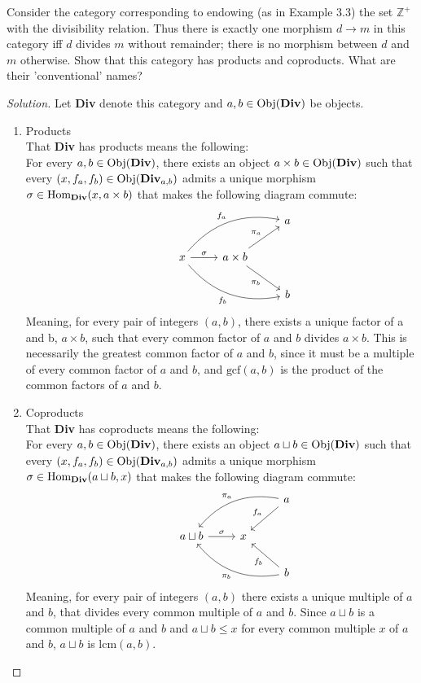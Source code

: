 \documentclass[12pt]{article}
\newenvironment{problem}[2][Problem]{\begin{trivlist}
\item[\hskip \labelsep {\bfseries #1}\hskip \labelsep {\bfseries #2.}]}{\end{trivlist}}
\newcommand{\catname}[1]{\normalfont\textbf{#1}}
\newcommand{\catsub}[2]{\normalfont\textbf{#1}_{#2}}
\newcommand{\Hom}{\text{Hom}}
\newcommand{\Homc}[2]{\Hom_{\catname{#1}}(#2)}
\newcommand{\Obj}{\text{Obj}}
\newcommand{\Objc}[1]{\text{Obj}(\catname{#1})}
\newenvironment{solution}
  {\renewcommand\qedsymbol{$\blacksquare$}\begin{proof}[Solution]}
{\end{proof}}
\begin{document}
\begin{problem}{5.6}
  Consider the category corresponding to endowing (as in Example 3.3) the set $\mathbb{Z}^+$ with the divisibility relation. 
  Thus there is exactly one morphism $d \to m$ in this category iff $d$ divides $m$ without remainder; there is no morphism between $d$ and $m$ otherwise.
  Show that this category has products and coproducts. What are their 'conventional' names?
\end{problem}
\begin{solution}
  Let \catname{Div} denote this category and $a, b \in \Objc{Div}$ be objects.
  \begin{enumerate}
    \item Products\\
        That \catname{Div} has products means the following:\\
    For every $a, b \in \Objc{Div}$, 
    there exists an object $a\times b \in \Objc{Div}$ such that
    every $(x,f_a,f_b) \in \Obj(\catsub{Div}{a,b})$
    admits a unique morphism $\sigma \in \Homc{Div}{x, a\times b}$
    that makes the following diagram commute:
    \[\begin{tikzcd}
      &&&a\\
      &x \ar[bend left]{urr}{f_a} \ar{r}{\sigma} \ar[bend right]{drr}[swap]{f_b}
      &a\times b \ar{ur}{\pi_a} \ar{dr}[swap]{\pi_b}&\\
      &&&b
    \end{tikzcd}\]
    Meaning, for every pair of integers $(a,b)$, there exists a unique
    factor of a and b, $a\times b$, such that 
    every common factor of $a$ and $b$ divides $a\times b$.
    This is necessarily the greatest common factor of $a$ and $b$, since
    it must be a multiple of every common factor of $a$ and $b$, and 
    $\text{gcf}(a,b)$ is the product of the common factors of $a$ and $b$.
  \item Coproducts\\
    That \catname{Div} has coproducts means the following:\\
    For every $a, b \in \Objc{Div}$, 
    there exists an object $a\sqcup b \in \Objc{Div}$ such that
    every $(x,f_a,f_b) \in \Obj(\catsub{Div}{a,b})$
    admits a unique morphism $\sigma \in \Homc{Div}{a\sqcup b, x}$
    that makes the following diagram commute:
    \[\begin{tikzcd}
        &&&a \ar[bend right, swap]{dll}{\pi_a} \ar[swap]{dl}{f_a}\\
      &a\sqcup b \ar{r}{\sigma} 
      &x &\\
      &&&b \ar[bend left]{ull}{\pi_b} \ar{ul}{f_b}
    \end{tikzcd}\]
    Meaning, for every pair of integers $(a,b)$ there exists a unique multiple of $a$ and $b$, that divides every common multiple of $a$ and $b$. 
    Since $a\sqcup b$ is a common multiple of $a$ and $b$ and $a\sqcup b \leq x$ for every common multiple $x$ of $a$ and $b$, $a\sqcup b$ is $\text{lcm}(a,b)$.
  \end{enumerate}
\end{solution}
\end{document}
